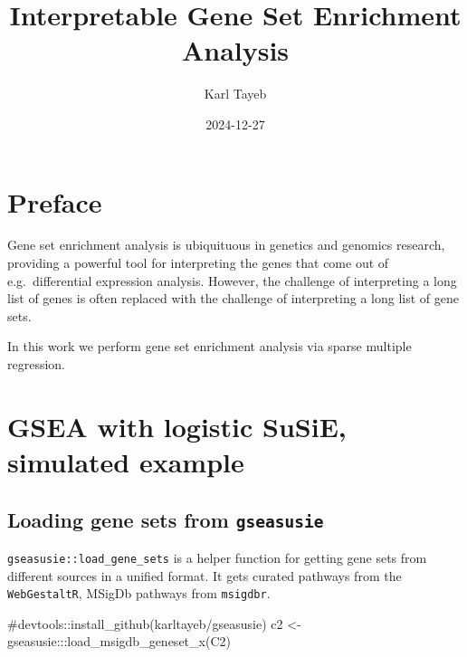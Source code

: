 \documentclass[
  letterpaper,
  DIV=11,
  numbers=noendperiod]{scrreprt}
\title{Interpretable Gene Set Enrichment Analysis}
\author{Karl Tayeb}
\date{2024-12-27}
\newenvironment{Shaded}{\begin{snugshade}}{\end{snugshade}}
\newcommand{\CommentTok}[1]{\textcolor[rgb]{0.37,0.37,0.37}{#1}}
\newcommand{\FunctionTok}[1]{\textcolor[rgb]{0.28,0.35,0.67}{#1}}
\newcommand{\NormalTok}[1]{\textcolor[rgb]{0.00,0.23,0.31}{#1}}
\newcommand{\OtherTok}[1]{\textcolor[rgb]{0.00,0.23,0.31}{#1}}
\newcommand{\SpecialCharTok}[1]{\textcolor[rgb]{0.37,0.37,0.37}{#1}}
\newcommand{\StringTok}[1]{\textcolor[rgb]{0.13,0.47,0.30}{#1}}
\renewcommand*\contentsname{Table of contents}
\newcommand\contentsname{Table of contents}
\begin{document}
\maketitle

\renewcommand*\contentsname{Table of contents}
{
\hypersetup{linkcolor=}
\setcounter{tocdepth}{2}
\tableofcontents
}


\chapter*{Preface}\label{preface}


Gene set enrichment analysis is ubiquituous in genetics and genomics
research, providing a powerful tool for interpreting the genes that come
out of e.g.~differential expression analysis. However, the challenge of
interpreting a long list of genes is often replaced with the challenge
of interpreting a long list of gene sets.

In this work we perform gene set enrichment analysis via sparse multiple
regression.


\chapter{GSEA with logistic SuSiE, simulated
example}\label{gsea-with-logistic-susie-simulated-example}

\section{\texorpdfstring{Loading gene sets from
\texttt{gseasusie}}{Loading gene sets from gseasusie}}\label{loading-gene-sets-from-gseasusie}

\texttt{gseasusie::load\_gene\_sets} is a helper function for getting
gene sets from different sources in a unified format. It gets curated
pathways from the \texttt{WebGestaltR}, MSigDb pathways from
\texttt{msigdbr}.

\begin{Shaded}
\begin{Highlighting}[]
\CommentTok{\#devtools::install\_github(\textquotesingle{}karltayeb/gseasusie\textquotesingle{})}
\NormalTok{c2 }\OtherTok{\textless{}{-}}\NormalTok{ gseasusie}\SpecialCharTok{:::}\FunctionTok{load\_msigdb\_geneset\_x}\NormalTok{(}\StringTok{\textquotesingle{}C2\textquotesingle{}}\NormalTok{)}
\end{Highlighting}
\end{Shaded}
\end{document}
